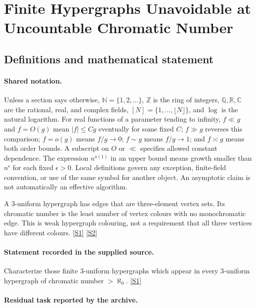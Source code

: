 \documentclass[11pt,a4paper]{article}
\newcommand{\N}{\mathbb{N}}
\newcommand{\Z}{\mathbb{Z}}
\newcommand{\Q}{\mathbb{Q}}
\newcommand{\R}{\mathbb{R}}
\newcommand{\C}{\mathbb{C}}
\newcommand{\sref}[2]{\hyperlink{source:#1:#2}{[S#2]}}
\begin{document}
\section{Finite Hypergraphs Unavoidable at Uncountable Chromatic Number}\label{statement}


\subsection{Definitions and mathematical statement}

\paragraph{Shared notation.}Unless a section says otherwise, $\N=\{1,2,\ldots\}$,
$\Z$ is the ring of integers, $\Q,\R,\C$ are the rational, real, and complex
fields, $[N]=\{1,\ldots,\lfloor N\rfloor\}$, and $\log$ is the natural
logarithm. For real functions of a parameter tending to infinity,
$f\ll g$ and $f=O(g)$ mean $|f|\leq Cg$ eventually for some fixed $C$;
$f\gg g$ reverses this comparison; $f=o(g)$ means $f/g\to0$;
$f\sim g$ means $f/g\to1$; and $f\asymp g$ means both order bounds.
A subscript on $O$ or $\ll$ specifies allowed constant dependence.
The expression $n^{o(1)}$ in an upper bound means growth smaller than
$n^\epsilon$ for each fixed $\epsilon>0$. Local definitions govern any
exception, finite-field convention, or use of the same symbol for another
object. An asymptotic claim is not automatically an effective algorithm.



A 3-uniform hypergraph has edges that are three-element vertex sets. Its chromatic number is the least number of vertex colours with no monochromatic edge. This is weak hypergraph colouring, not a requirement that all three vertices have different colours. \sref{statement}{1} \sref{statement}{2}

\paragraph{Statement recorded in the supplied source.}
Characterize those finite 3-uniform hypergraphs which appear in every 3-uniform hypergraph of chromatic number $>\aleph_0$. \sref{statement}{1}

\paragraph{Residual task reported by the archive.}
\end{document}
